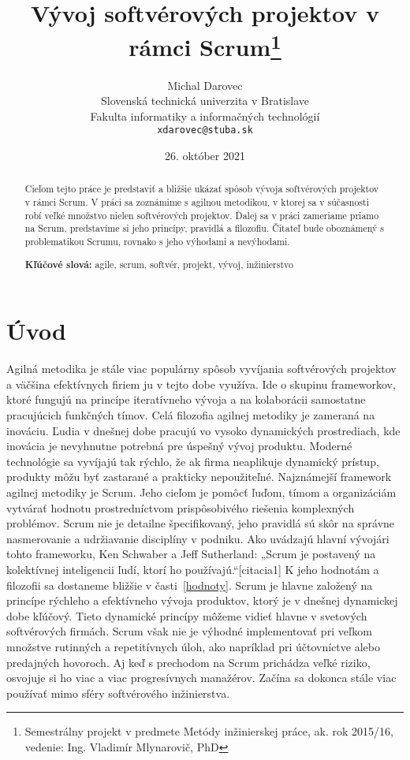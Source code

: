 \documentclass[10pt,twoside,slovak,a4paper]{article}
\title{Vývoj softvérových projektov v rámci Scrum\thanks{Semestrálny projekt v predmete Metódy inžinierskej práce, ak. rok 2015/16, vedenie: Ing. Vladimír Mlynarovič, PhD}} %
\author{Michal Darovec\\[2pt]
	{\small Slovenská technická univerzita v Bratislave}\\
	{\small Fakulta informatiky a informačných technológií}\\
	{\small \texttt{xdarovec@stuba.sk}}
	}
\date{\small 26. október 2021} %
\begin{document}
\maketitle

\begin{abstract}
Cieľom tejto práce je predstaviť a bližšie ukázať spôsob vývoja softvérových projektov v rámci Scrum. V práci sa zoznámime s agilnou metodikou, v ktorej sa v súčasnosti robí veľké množstvo nielen softvérových projektov. Ďalej sa v práci zameriame priamo na Scrum, predstavíme si jeho princípy, pravidlá a filozofiu. Čitateľ bude oboznámený s problematikou Scrumu, rovnako s jeho výhodami a nevýhodami.

\textbf{Kľúčové slová:} agile, scrum, softvér, projekt, vývoj, inžinierstvo
\end{abstract}



\section{Úvod}

Agilná metodika je stále viac populárny spôsob vyvíjania softvérových projektov a väčšina efektívnych firiem ju v tejto dobe využíva. Ide o skupinu frameworkov, ktoré fungujú na princípe iteratívneho vývoja a na kolaborácii samostatne pracujúcich funkčných tímov.
Celá filozofia agilnej metodiky je zameraná na inováciu. Ľudia v dnešnej dobe pracujú vo vysoko dynamických prostrediach, kde inovácia je nevyhnutne potrebná pre úspešný vývoj produktu. Moderné technológie sa vyvíjajú tak rýchlo, že ak firma neaplikuje dynamický prístup, produkty môžu byť zastarané a prakticky nepoužiteľné.
Najznámejší framework agilnej metodiky je Scrum. Jeho cieľom je pomôcť ľuďom, tímom a organizáciám vytvárať hodnotu prostredníctvom prispôsobivého riešenia komplexných problémov. Scrum nie je detailne špecifikovaný, jeho pravidlá sú skôr na správne nasmerovanie a udržiavanie disciplíny v podniku. Ako uvádzajú hlavní vývojári tohto frameworku, Ken Schwaber a Jeff Sutherland: „Scrum je postavený na kolektívnej inteligencii ľudí, ktorí ho používajú.“[citacia1] K jeho hodnotám a filozofii sa dostaneme bližšie v časti~\ref{hodnoty}.
Scrum je hlavne založený na princípe rýchleho a efektívneho vývoja produktov, ktorý je v dnešnej dynamickej dobe kľúčový. Tieto dynamické princípy môžeme vidieť hlavne v svetových softvérových firmách. Scrum však nie je výhodné implementovať pri veľkom množstve rutinných a repetitívnych úloh, ako napríklad pri účtovníctve alebo predajných hovoroch. Aj keď s prechodom na Scrum prichádza veľké riziko, osvojuje si ho viac a viac progresívnych manažérov. Začína sa dokonca stále viac používať mimo sféry softvérového inžinierstva.
\end{document}
